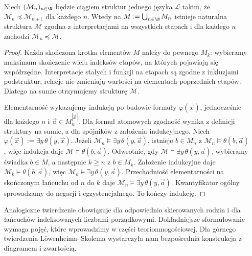 \begin{lemat}
\label{lem:ls-elementary-chain}
Niech $(\mathcal M_n)_{n\in\N}$ będzie ciągiem
struktur jednego języka $\mathcal L$
takim, że $\mathcal M_n\preccurlyeq\mathcal M_{n+1}$
dla każdego $n$. Wtedy na
$M:=\bigcup_{n\in\N}M_n$ istnieje naturalna
struktura $\mathcal M$ zgodna z interpretacjami
na wszystkich etapach i dla każdego $n$
zachodzi $\mathcal M_n\preccurlyeq\mathcal M$.
\end{lemat}
\begin{proof}
Każda skończona krotka elementów $M$
należy do pewnego $M_k$: wybieramy
maksimum skończenie wielu indeksów etapów,
na których pojawiają się współrzędne.
Interpretacje stałych i funkcji na etapach
są zgodne z inkluzjami podstruktur;
relacje nie zmieniają wartości
na elementach poprzednich etapów.
Dlatego na sumie otrzymujemy strukturę
$\mathcal M$.

Elementarność wykazujemy indukcją
po budowie formuły $\varphi(\vec x)$,
jednocześnie dla każdego $n$ i
$\vec a\in M_n^{|\vec x|}$.
Dla formuł atomowych zgodność
wynika z definicji struktury na sumie,
a dla spójników z założenia indukcyjnego.
Niech $\varphi(\vec x):=\exists y\,\theta(y,\vec x)$.
Jeżeli $\mathcal M_n\models
\exists y\,\theta(y,\vec a)$,
istnieje $b\in M_n$ z
$\mathcal M_n\models\theta(b,\vec a)$,
więc indukcja daje
$\mathcal M\models\theta(b,\vec a)$.
Odwrotnie, gdy
$\mathcal M\models\exists y\,\theta(y,\vec a)$,
wybieramy świadka $b\in M$, a następnie
$k\ge n$ z $b\in M_k$.
Założenie indukcyjne daje
$\mathcal M_k\models\theta(b,\vec a)$,
więc $\mathcal M_k\models
\exists y\,\theta(y,\vec a)$.
Przechodniość elementarności na
skończonym łańcuchu od $n$ do $k$
daje $\mathcal M_n\models
\exists y\,\theta(y,\vec a)$.
Kwantyfikator ogólny sprowadzamy
do negacji i egzystencjalnego.
To kończy indukcję.
\end{proof}

\begin{uwaga}
\label{rem:ls-transfinite-chains}
Analogiczne twierdzenie obowiązuje
dla odpowiednio skierowanych rodzin
i dla łańcuchów indeksowanych
liczbami porządkowymi. Dokładniejsze
sformułowanie wymaga pojęć, które
wprowadzimy w części teoriomnogościowej.
Dla górnego twierdzenia
Löwenheima--Skolema wystarczyła nam
bezpośrednia konstrukcja z diagramem i zwartością.
\end{uwaga}

